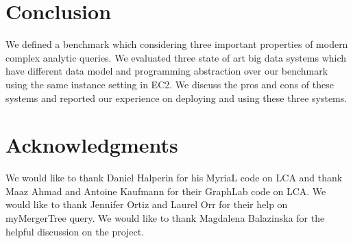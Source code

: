 \section{Conclusion}

We defined a benchmark which considering three important properties of modern
complex analytic queries. We evaluated three state of art big data systems 
which have different data model and programming abstraction over our benchmark
using the same instance setting in EC2. We discuss the pros and cons of these
systems and reported our experience on deploying and using these three systems.

\section{Acknowledgments}

We would like to thank Daniel Halperin for his MyriaL code on LCA and thank 
Maaz Ahmad and Antoine Kaufmann for their GraphLab code on LCA. We would like 
to thank Jennifer Ortiz and Laurel Orr for their help on myMergerTree query. 
We would like to thank Magdalena Balazinska for the helpful discussion on the
project.



